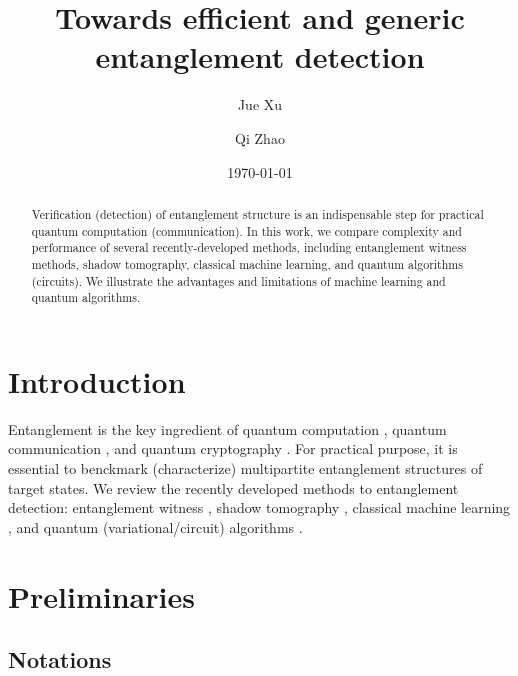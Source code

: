 \documentclass[
10pt,
aps,
pra,
linenumbers,
floatfix,
]{revtex4-2}
\theoremstyle{plain}
\theoremstyle{definition}
\begin{document}
\title{Towards efficient and generic entanglement detection}
\author{Jue Xu}
\author{Qi Zhao}
\date{\today}
\begin{abstract}
	Verification (detection) of entanglement structure is an indispensable step for practical quantum computation (communication).
	In this work, we compare complexity and performance of several recently-developed methods, including entanglement witness methods, shadow tomography, classical machine learning, and quantum algorithms (circuits).
	We illustrate the advantages and limitations of machine learning and quantum algorithms.
\end{abstract}

\maketitle
 \tableofcontents

\section{Introduction}
Entanglement \cite{horodeckiQuantumEntanglement2009} is the key ingredient of quantum computation \cite{}, quantum communication \cite{}, and quantum cryptography \cite{}.
For practical purpose, it is essential to benckmark (characterize) multipartite entanglement structures of target states.
We review the recently developed methods to entanglement detection: entanglement witness \cite{zhouDetectingMultipartiteEntanglement2019}, shadow tomography \cite{huangPredictingManyProperties2020}, classical machine learning \cite{huangPowerDataQuantum2021}, and quantum (variational/circuit) algorithms \cite{quekMultivariateTraceEstimation2022}.

\section{Preliminaries}
\subsection{Notations}
\end{document}
